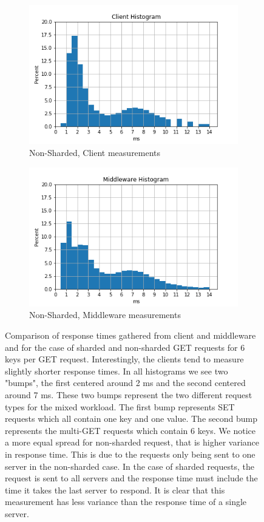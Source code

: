 \documentclass[11pt,a4paper]{article}
\begin{document}
\begin{figure}[]
\begin{subfigure}[b]{0.5\linewidth}
    \includegraphics[width=1\linewidth]{52/52_client_histogram.png} 
    \caption{Non-Sharded, Client measurements} 
    \label{fig7:c} 
  \end{subfigure}%
  \begin{subfigure}[b]{0.5\linewidth}
    \centering
    \includegraphics[width=1\linewidth]{52/52_mw_histogram.png} 
    \caption{Non-Sharded, Middleware measurements} 
    \label{fig7:d} 
  \end{subfigure} 
  \caption{Comparison of response times gathered from client and middleware and for the case of sharded and non-sharded GET requests for 6 keys per GET request. Interestingly, the clients tend to measure slightly shorter response times. In all histograms we see two "bumps", the first centered around 2 ms and the second centered around 7 ms. These two bumps represent the two different request types for the mixed workload. The first bump represents SET requests which all contain one key and one value. The second bump represents the multi-GET requests which contain 6 keys. We notice a more equal spread for non-sharded request, that is higher variance in response time. This is due to the requests only being sent to one server in the non-sharded case. In the case of sharded requests, the request is sent to all servers and the response time must include the time it takes the last server to respond. It is clear that this measurement has less variance than the response time of a single server.}
  \label{fig7} 
\end{figure}
\end{document}
